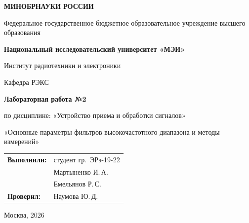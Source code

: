 \begin{titlepage}
    \centering
    {\bfseries МИНОБРНАУКИ РОССИИ\par}
    Федеральное государственное бюджетное образовательное учреждение высшего образования \\
    {\bfseries Национальный исследовательский университет «МЭИ»\par}
    \vspace{1cm}
    Институт радиотехники и электроники\par
    Кафедра РЭКС\par
    \vspace{3cm}
    
    {\bfseries\large Лабораторная работа №2\par}
    \vspace{0.5cm}
    {\large по дисциплине: «Устройство приема и обработки сигналов»\par}
    
    \vspace{0.5cm}
    {\large «Основные параметры фильтров высокочастотного диапазона и методы измерений»\par}
    \vspace{3.5cm}
 \vspace{1.5cm}
\noindent\hfill
\begin{tabular}{@{}ll@{}}
    \textbf{Выполнили:} & студент гр.~ЭРэ-19-22 \\
                        & Мартыненко И.\,А. \\
                        & Емельянов Р.\,С. \\

    \textbf{Проверил:}  & Наумова Ю.\,Д.
\end{tabular}   
    \vfill
    {Москва, 2026}
\end{titlepage}
